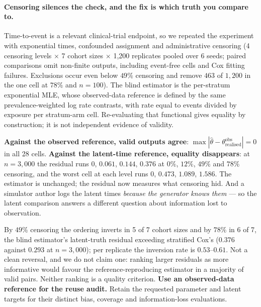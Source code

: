 \iffull
\paragraph{Censoring silences the check, and the fix is which truth you compare
to.} Time-to-event is a relevant clinical-trial endpoint,
so we repeated the experiment with exponential times, confounded assignment and
administrative censoring (4 censoring levels $\times$ 7 cohort sizes $\times$
1{,}200 replicates pooled over 6 seeds; paired comparisons omit non-finite
outputs, including event-free cells and Cox fitting failures. Exclusions occur
even below $49\%$ censoring and remove $463$ of $1{,}200$ in
the one cell at $78\%$ and $n = 100$). The blind estimator is the per-stratum
exponential MLE, whose observed-data reference is defined by the same
prevalence-weighted log rate contrasts, with rate equal to events divided by
exposure per stratum-arm cell. Re-evaluating that functional gives equality by
construction; it is not independent evidence of validity.

\textbf{Against the observed reference, valid outputs agree}: $\max|\hat\theta -
\theta_{\text{realised}}^{\text{obs}}| = 0$ in all 28 cells. \textbf{Against the
latent-time reference, equality disappears}: at $n = 3{,}000$ the residual runs
$0$, $0.061$, $0.144$, $0.376$ at $0\%$, $12\%$, $49\%$ and $78\%$ censoring,
and the worst cell at each level runs $0$, $0.473$, $1.089$, $1.586$. The estimator is unchanged; the
residual now measures what censoring hid. And a simulator author logs the
latent times \emph{because the generator knows them} --- so the latent comparison answers a different question about
information lost to observation.

By $49\%$ censoring the ordering inverts in 5 of 7 cohort sizes and by $78\%$
in 6 of 7, the blind estimator's latent-truth residual exceeding stratified
Cox's ($0.376$ against $0.293$ at $n = 3{,}000$); per replicate the inversion
rate is $0.53$--$0.61$. Not a clean reversal, and we do not claim one: ranking larger residuals as more informative would favour the
reference-reproducing estimator in a majority of valid pairs. Neither ranking
is a quality criterion. \textbf{Use an observed-data reference for the reuse
audit.} Retain the requested parameter and latent targets for their distinct
bias, coverage and information-loss evaluations.
\fi

